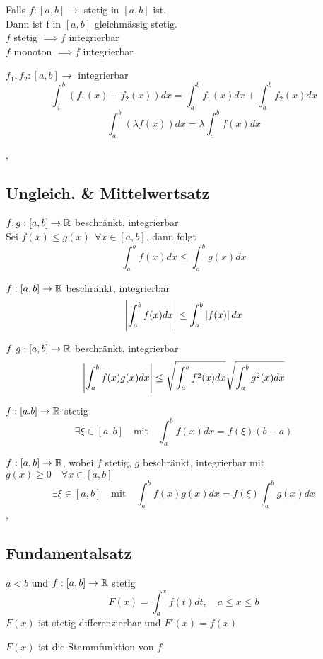 \Satz[5.2.6] Falls $f : [a, b] \rightarrow $ stetig in $[a, b]$ ist. \\
Dann ist f in $[a,b]$ gleichmässig stetig. \\

\Satz[5.2.7] $f$ stetig $\implies f$ integrierbar \\

\Satz[5.2.8] $f$ monoton $\implies f$ integrierbar

\Satz[5.2.10] $f_1, f_2 : [a,b] \rightarrow$ integrierbar
\[\int_{a}^{b} (f_1(x) + f_2(x)) dx = \int_{a}^{b} f_1(x) dx + \int_{a}^{b} f_2(x) dx \]
\[\int_{a}^{b} (\lambda f(x)) dx = \lambda \int_{a}^{b} f(x) dx \]

\sep

\subsection{Ungleich. \& Mittelwertsatz}

\Satz[5.3.1] $f, g : [a,b] \rightarrow \mathbb{R}$ beschränkt, integrierbar \\
Sei \(f(x) \leq g(x) \ \ \forall x \in [a,b] \), dann folgt
\[ \int_{a}^{b} f(x) dx \leq \int_{a}^{b} g(x) dx \]

\Korollar[5.3.2] $f : [a, b] \rightarrow \mathbb{R}$ beschränkt, integrierbar
\[ \left\lvert \int_{a}^{b} f(x) dx \right\rvert \leq \int_{a}^{b} \left\lvert f(x) \right\rvert dx \]

\Satz[5.3.3] $f, g : [a,b] \rightarrow \mathbb{R}$ beschränkt, integrierbar
\[ \left\lvert  \int_a^b f(x) g(x) dx  \right\rvert \leq \sqrt{\int_a^b f^2(x) dx} \sqrt{\int_a^b g^2(x) dx} \] 

\Satz[5.3.4] $f : [a.b] \rightarrow \mathbb{R}$ stetig
\[ \exists \xi \in [a, b] \quad \text{mit} \quad \int_a^b f(x) dx = f(\xi) (b-a) \]

\Satz[5.3.6] $ f: [a, b] \rightarrow \mathbb{R}$, wobei $f$ stetig, $g$ beschränkt, integrierbar mit $g(x) \geq 0 \quad \forall x \in [a,b]$
\[ \exists \xi \in [a, b] \quad \text{mit} \quad \int_a^b f(x) g(x) dx = f(\xi) \int_a^b g(x) dx  \]
\sep

\subsection{Fundamentalsatz}

\Satz[5.4.1] $a < b$ und $f : [a,b] \rightarrow \mathbb{R}$ stetig
\[ F(x) = \int_a^x f(t) dt, \quad a \leq x \leq b \]
$F(x)$ ist stetig differenzierbar und $F'(x) = f(x)$

\Def[5.4.2] $F(x)$ ist die Stammfunktion von $f$ \\

